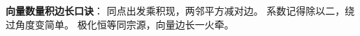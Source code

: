 \begin{summarybox}
\textbf{向量数量积边长口诀}：
同点出发乘积现，两邻平方减对边。
系数记得除以二，绕过角度变简单。
极化恒等同宗源，向量边长一火牵。
\end{summarybox}